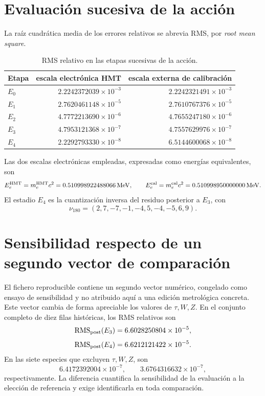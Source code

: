 \section{Evaluación sucesiva de la acción}

La raíz cuadrática media de los errores relativos se abrevia RMS, por
\emph{root mean square}.

\begin{table}[htbp]
\centering
\caption{RMS relativo en las etapas sucesivas de la acción.}
\label{tab:rms-etapas}
\begin{tabular}{@{}lrr@{}}
\toprule
Etapa & escala electrónica HMT & escala externa de calibración\\
\midrule
\(E_0\)&\(2.2242372039\times10^{-3}\)&\(2.2242321491\times10^{-3}\)\\
\(E_1\)&\(2.7620461148\times10^{-5}\)&\(2.7610767376\times10^{-5}\)\\
\(E_2\)&\(4.7772213690\times10^{-6}\)&\(4.7655247180\times10^{-6}\)\\
\(E_3\)&\(4.7953121368\times10^{-7}\)&\(4.7557629976\times10^{-7}\)\\
\(E_4\)&\(2.2292793330\times10^{-8}\)&\(6.5144600068\times10^{-8}\)\\
\bottomrule
\end{tabular}
\end{table}

Las dos escalas electrónicas empleadas, expresadas como energías equivalentes,
son
\[
 E_e^{\rm HMT}=m_e^{\rm HMT}c^2
 =0.510998922488066\,\mathrm{MeV},
 \qquad
 E_e^{\rm cal}=m_e^{\rm cal}c^2
 =0.510998950000000\,\mathrm{MeV}.
\]
El estadio \(E_4\) es la cuantización
inversa del residuo posterior a \(E_3\), con
\[
 \nu_{180}=(2,7,-7,-1,-4,5,-4,-5,6,9).
\]

\section{Sensibilidad respecto de un segundo vector de comparación}

El fichero reproducible contiene un segundo vector numérico, congelado como
ensayo de sensibilidad y no atribuido aquí a una edición metrológica concreta.
Este vector cambia de forma apreciable los valores de \(\tau,W,Z\). En el
conjunto completo de diez filas históricas, los RMS relativos son
\[
 \operatorname{RMS}_{\rm post}(E_3)=6.6028250804\times10^{-5},
\]
\[
 \operatorname{RMS}_{\rm post}(E_4)=6.6212121422\times10^{-5}.
\]
En las siete especies que excluyen \(\tau,W,Z\), son
\[
 6.4172392004\times10^{-7},
 \qquad
 3.6764316632\times10^{-7},
\]
respectivamente. La diferencia cuantifica la sensibilidad de la evaluación a
la elección de referencia y exige identificarla en toda comparación.

